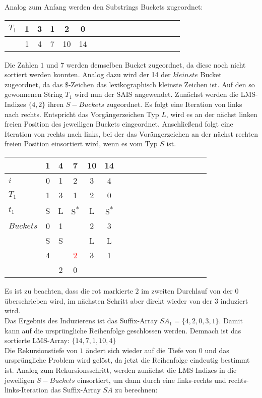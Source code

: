 \newpage \noindent Analog zum Anfang werden den Substrings Buckets zugeordnet:

\begin{center}
  \begin{tabular}{ | l | c | c | c | c | c | c | c | c | c | c | c | c | c | c | c | c | }
    \hline
        $T_1$ & 1 & 3 & 1 & 2 & 0 \\ \hline
              & 1 & 4 & 7 & 10 & 14  \\
    \hline
  \end{tabular}
\end{center}
\bigskip

\noindent Die Zahlen $1$ und $7$ werden demselben Bucket zugeordnet, da diese noch nicht sortiert werden konnten. Analog dazu wird der 14 der $kleinste$ Bucket zugeordnet, da das $\$$-Zeichen das lexikographisch kleinste Zeichen ist. Auf den so gewonnenen String $T_1$ wird nun der SAIS angewendet. Zunächst werden die LMS-Indizes $\{4, 2\}$ ihren $S-Buckets$ zugeordnet. Es folgt eine Iteration von links nach rechts. Entspricht das Vorgängerzeichen Typ $L$, wird es an der nächst linken freien Position des jeweiligen Buckets eingeordnet. Anschließend folgt eine Iteration von rechts nach links, bei der das Vorängerzeichen an der nächst rechten freien Position einsortiert wird, wenn es vom Typ $S$ ist.

\begin{center}
  \begin{tabular}{ | l | c | c | c | c | c | c | c | c | c | c | c | c | c | c | c | c | }
    \hline
          & \tiny{1} & \tiny{4} & \tiny{7} & \tiny{10} & \tiny{14} \\ \hline
      $i$ & 0 & 1 & 2 & 3 & 4  \\ \hline
    $T_1$ & 1 & 3 & 1 & 2 & 0  \\ \hline
      $t_1$ & S & L & S\textsuperscript{*} & L & S\textsuperscript{*}  \\ \hline
$Buckets$ & 0 & \multicolumn{1}{c}{1} & & 2 & 3 \\ \hline
          & S & \multicolumn{1}{c}{S} & & L & L \\ \hline
          & 4 & & \textcolor{red}{2} & 3 & 1 \\ \hline
          & & 2 & 0 & & \\
    \hline
  \end{tabular}
\end{center}
\bigskip

\noindent Es ist zu beachten, dass die rot markierte $2$ im zweiten Durchlauf von der $0$ überschrieben wird, im nächsten Schritt aber direkt wieder von der $3$ induziert wird. \\
Das Ergebnis des Induzierens ist das Suffix-Array $SA_1 = \{4, 2, 0, 3, 1\}$. Damit kann auf die ursprüngliche Reihenfolge geschlossen werden. Demnach ist das sortierte LMS-Array: $\{14, 7, 1, 10, 4\}$ \\
Die Rekursionstiefe von $1$ ändert sich wieder auf die Tiefe von $0$ und das ursprüngliche Problem wird gelöst, da jetzt die Reihenfolge eindeutig bestimmt ist. Analog zum Rekursionsschritt, werden zunächst die LMS-Indizes in die jeweiligen $S-Buckets$ einsortiert, um dann durch eine links-rechts und rechts-links-Iteration das Suffix-Array $SA$ zu berechnen:

